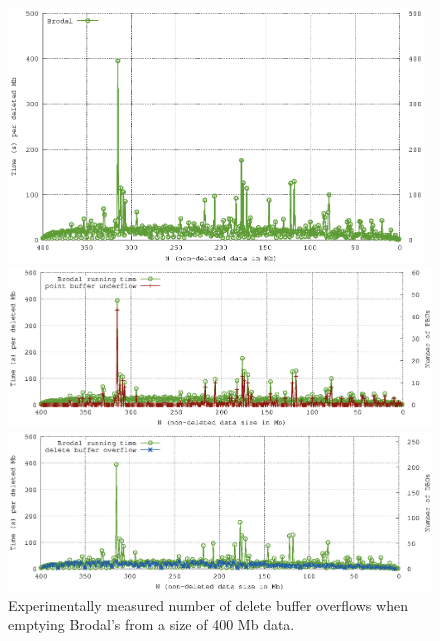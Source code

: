 \documentclass[twoside,11pt,openright]{report}
\begin{document}
\begin{figure}[h]
\centering

\includegraphics[width=0.98\textwidth]{../src/experiments/delete_experiment_results/2016-05-31.08_55_51/time3}
\caption{Experimentally measured running time when emptying Brodal's from a size of 400 Mb data. Clearly we see fluctuations in the running time. These are perfectly explained by the number of point buffer underflows depicted in Figure~\ref{fig:delete_pbu_time_result_brodal_400mb} and the number of delete buffer overflows depicted in Figure~\ref{fig:delete_dbo_time_result_brodal_400mb}.}
\label{fig:delete_complexity_result_brodal_400mb}

\includegraphics[width=0.98\linewidth]{../src/experiments/delete_experiment_results/2016-05-31.08_55_51/pbu_time}
\caption{Experimentally measured number of point buffer underflows when emptying Brodal's from a size of 400 Mb data.}
\label{fig:delete_pbu_time_result_brodal_400mb}

\includegraphics[width=0.98\linewidth]{../src/experiments/delete_experiment_results/2016-05-31.08_55_51/dbo_time}
\caption{Experimentally measured number of delete buffer overflows when emptying Brodal's from a size of 400 Mb data.}
\label{fig:delete_dbo_time_result_brodal_400mb}

\end{figure}
\end{document}
